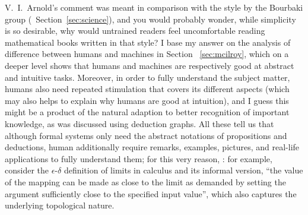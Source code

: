V.~I.\ Arnold's comment was meant in comparison with the style by
the Bourbaki group (\cf~Section~\ref{sec:science}), and you would probably
wonder, while simplicity is so desirable, why would untrained readers feel
uncomfortable reading mathematical books written in that style?  I base my
answer on the analysis of difference between humans and machines in Section~%
\ref{sec:mcilroy}, which on a deeper level shows that humans and machines are
respectively good at abstract and intuitive tasks.  Moreover, in order to fully
understand the subject matter, humans also need repeated stimulation that covers
its different aspects (which may also helps to explain why humans are good
at intuition), and I guess this might be a product of the natural adaption
to better recognition of important knowledge, as was discussed using deduction
graphs.  All these tell us that although formal systems only need the abstract
notations of propositions and deductions, human additionally require remarks,
examples, pictures, and real-life applications to fully understand them;
for this very reason, : for example,
consider the $\epsilon$-$\delta$ definition of limits in calculus and its
informal version, ``the value of the mapping can be made as close to the
limit as demanded by setting the argument sufficiently close to the specified
input value'', which also captures the underlying topological nature.

